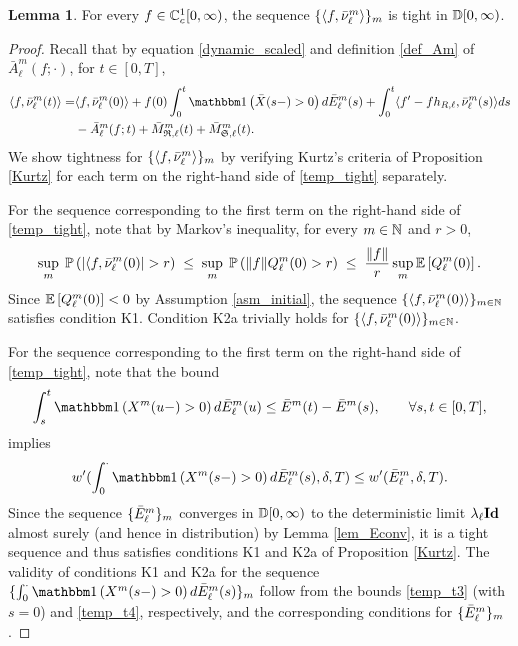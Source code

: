 \documentclass{article}
\theoremstyle{definition}
\newtheorem{lemma}[theorem]{Lemma}
\numberwithin{equation}{section}
\begin{document}
\begin{lemma}\label{lem_nuK2}
For every $f\in\mathbb{C}^1_c[0,\infty)$, the sequence $\{\langle f,\bar{\nu}^m_\ell\rangle \}_m$ is tight in $\mathbb{D}[0,\infty)$.
\end{lemma}

\begin{proof}
Recall that by equation \eqref{dynamic_scaled} and definition \eqref{def_Am} of $\bar A^m_\ell(f;\cdot)$, for $t\in[0,T]$,
\begin{align}\label{temp_tight}
    \langle f,\bnu^m_\ell(t) \rangle = & \langle f,\bnu^m_\ell(0)\rangle + f(0)\int_0^t \indic{\bx(s-)>0} d \barrival^m_\ell(s) + \int_0^t \langle f'-fh_{R,\ell},\bnu^m_\ell(s)\rangle ds \notag\\&-\bar A^m_\ell(f;t) +  \bar M^m_{\mathfrak{R},\ell}(t)+\bar M^m_{\mathfrak{S},\ell}(t).
\end{align}
We show tightness for $\{\langle f,\bar{\nu}^m_\ell\rangle \}_m$ by verifying Kurtz's criteria of Proposition \ref{Kurtz} for each term on the right-hand side of \eqref{temp_tight} separately.

For the sequence corresponding to the first term on the right-hand side of \eqref{temp_tight}, note that by Markov's inequality, for every $m\in\mathbb{N}$ and $r>0$,
\[
\sup_m\;\Prob{|\langle f,\bnu_\ell^m(0)|>r}\;\leq\; \sup_m\; \Prob{\|f\|Q_\ell^m(0)>r} \;\leq\; \frac{\|f\|}{r} \sup_m \Ept{Q_\ell^m(0)}.
\]
Since $\mathbb{E}\left[Q_\ell^m(0)\right]<0$ by Assumption \ref{asm_initial}, the sequence $\{\langle f,\bar{\nu}^m_\ell(0)\rangle\}_{m\in\mathbb{N}}$ satisfies condition K1. Condition K2a trivially holds for $\{\langle f,\bar{\nu}^m_\ell(0)\rangle\}_{m\in\mathbb{N}}$.

For the sequence corresponding to the first term on the right-hand side of \eqref{temp_tight}, note that the bound
\begin{equation}\label{temp_t3}
  \int_s^{t}\indic{X^m(u-)>0}d\barrival^m_{\ell}(u)\leq \barrival^m(t)-\barrival^m(s),
\quad\quad\forall s,t\in[0,T], 
\end{equation}
implies 
\begin{equation}\label{temp_t4}
w^\prime(\int_0^{\cdot}\indic{X^m(s-)>0}d\barrival^m_{\ell}(s),\delta,T)\leq w'(\barrival_\ell^m,\delta,T).
\end{equation}
Since the sequence $\{\bar E_\ell^m\}_m$ converges in $\mathbb{D}[0,\infty)$ to the deterministic limit $\lambda_\ell \textbf{Id}$ almost surely (and hence in distribution) by Lemma \ref{lem_Econv}, it is a tight sequence and thus satisfies conditions K1 and K2a of Proposition \ref{Kurtz}. The validity of conditions K1 and K2a for the sequence $\{\int_0^\cdot\indic{X^m(s-)>0}d\barrival^m_{\ell}(s)\}_m$ follow from the bounds \eqref{temp_t3} (with $s=0$) and \eqref{temp_t4}, respectively, and the corresponding conditions for $\{\bar E_\ell^m\}_m$.


\end{proof}
\end{document}
